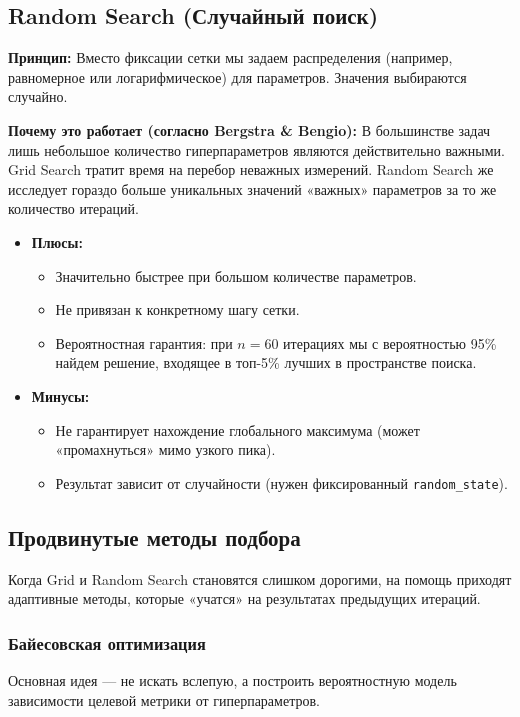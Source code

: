 \documentclass[12pt]{article}
\begin{document}
\subsection{Random Search (Случайный поиск)}
\textbf{Принцип:} Вместо фиксации сетки мы задаем распределения (например, равномерное или логарифмическое) для параметров. Значения выбираются случайно.

\textbf{Почему это работает (согласно Bergstra \& Bengio):} В большинстве задач лишь небольшое количество гиперпараметров являются действительно важными. Grid Search тратит время на перебор неважных измерений. Random Search же исследует гораздо больше уникальных значений «важных» параметров за то же количество итераций.

\begin{itemize}
    \item \textbf{Плюсы:} 
    \begin{itemize}
        \item Значительно быстрее при большом количестве параметров.
        \item Не привязан к конкретному шагу сетки.
        \item Вероятностная гарантия: при $n=60$ итерациях мы с вероятностью 95\% найдем решение, входящее в топ-5\% лучших в пространстве поиска.
    \end{itemize}
    \item \textbf{Минусы:} 
    \begin{itemize}
        \item Не гарантирует нахождение глобального максимума (может «промахнуться» мимо узкого пика).
        \item Результат зависит от случайности (нужен фиксированный \texttt{random\_state}).
    \end{itemize}
\end{itemize}


\subsection{Продвинутые методы подбора}

Когда Grid и Random Search становятся слишком дорогими, на помощь приходят адаптивные методы, которые «учатся» на результатах предыдущих итераций.

\subsubsection{Байесовская оптимизация}
Основная идея — не искать вслепую, а построить вероятностную модель зависимости целевой метрики от гиперпараметров.
\end{document}
